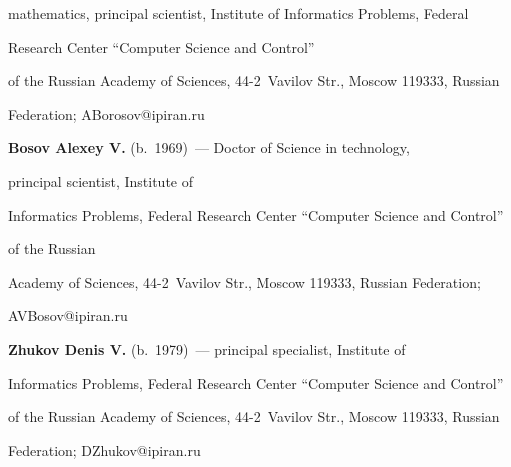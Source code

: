 mathematics, principal scientist, Institute of Informatics Problems, Federal


Research Center ``Computer Science and Control''


of the Russian Academy of Sciences, 44-2~Vavilov Str., Moscow 119333, Russian


Federation; \mbox{ABorosov@ipiran.ru}










\noindent


\textbf{Bosov Alexey V.} (b.\ 1969)~--- Doctor of Science in technology,


principal scientist, Institute of


Informatics Problems, Federal Research Center ``Computer Science and Control''


of the Russian


Academy of Sciences, 44-2~Vavilov Str., Moscow 119333, Russian Federation;


\mbox{AVBosov@ipiran.ru}










\noindent


\textbf{Zhukov Denis V.} (b.\ 1979)~--- principal specialist, Institute of


Informatics Problems, Federal Research Center ``Computer Science and Control''


of the Russian Academy of Sciences, 44-2~Vavilov Str., Moscow 119333, Russian


Federation; \mbox{DZhukov@ipiran.ru}





\label{end\stat}





\renewcommand{\bibname}{\protect\rm Литература}


